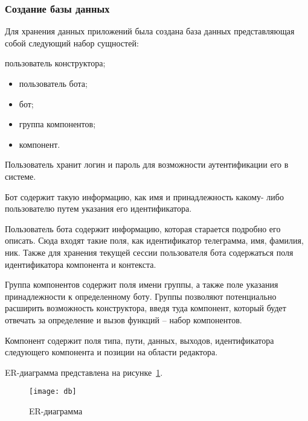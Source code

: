 
\subsubsection{Создание базы данных}

Для хранения данных приложений была создана база данных
представляющая собой следующий набор сущностей:

пользователь конструктора;
\begin{itemize}
	\item пользователь бота;
	\item бот;
	\item группа компонентов;
	\item компонент.
\end{itemize}

Пользователь хранит логин и пароль для возможности аутентификации
его в системе.

Бот содержит такую информацию, как имя и принадлежность какому-
либо пользователю путем указания его идентификатора.

Пользователь бота содержит информацию, которая старается подробно
его описать. Сюда входят такие поля, как идентификатор телеграмма, имя,
фамилия, ник. Также для хранения текущей сессии пользователя бота
содержаться поля идентификатора компонента и контекста.

Группа компонентов содержит поля имени группы, а также поле
указания принадлежности к определенному боту. Группы позволяют
потенциально расширить возможность конструктора, введя туда компонент,
который будет отвечать за определение и вызов функций – набор
компонентов.

Компонент содержит поля типа, пути, данных, выходов,
идентификатора следующего компонента и позиции на области редактора.

ER-диаграмма представлена на рисунке~\ref{f:erd}.
\newpage
\begin{figure}[!ht]
	\centering
	\texttt{[image: db]}
	\caption{ER-диаграмма}
	\label{f:erd}
\end{figure}


